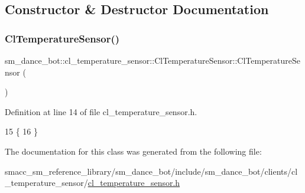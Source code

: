 \subsection{Constructor \& Destructor Documentation}
\mbox{\label{classsm__dance__bot_1_1cl__temperature__sensor_1_1ClTemperatureSensor_ac2e5d27f5110bc19393890214429d0bf}} 
\subsubsection{\texorpdfstring{Cl\+Temperature\+Sensor()}{ClTemperatureSensor()}}
{\footnotesize\ttfamily sm\+\_\+dance\+\_\+bot\+::cl\+\_\+temperature\+\_\+sensor\+::\+Cl\+Temperature\+Sensor\+::\+Cl\+Temperature\+Sensor (\begin{DoxyParamCaption}{ }\end{DoxyParamCaption})\hspace{0.3cm}{\ttfamily [inline]}}



Definition at line 14 of file cl\+\_\+temperature\+\_\+sensor.\+h.


\begin{DoxyCode}
15     \{
16     \}
\end{DoxyCode}


The documentation for this class was generated from the following file\+:\begin{DoxyCompactItemize}
\item 
smacc\+\_\+sm\+\_\+reference\+\_\+library/sm\+\_\+dance\+\_\+bot/include/sm\+\_\+dance\+\_\+bot/clients/cl\+\_\+temperature\+\_\+sensor/\hyperlink{sm__dance__bot_2include_2sm__dance__bot_2clients_2cl__temperature__sensor_2cl__temperature__sensor_8h}{cl\+\_\+temperature\+\_\+sensor.\+h}\end{DoxyCompactItemize}
